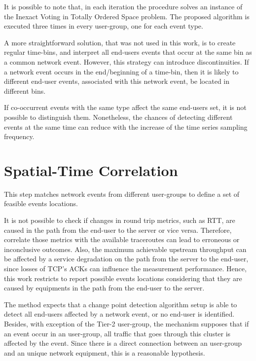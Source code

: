 It is possible to note that, in each iteration the procedure solves an instance
of the Inexact Voting in Totally Ordered Space problem.
The proposed algorithm is executed three times in every user-group,
one for each event type.

A more straightforward solution, that was not used in this work, is to create
regular time-bins, and interpret all end-users events that occur at the same
bin as a common network event.
However, this strategy can introduce
discontinuities. If a network event occurs in the end/beginning of a time-bin,
then it is likely to different end-user events, associated with this
network event, be located in different bins.

If co-occurrent events with the same type affect the same end-users set,
it is not possible to distinguish them. Nonetheless, the chances of
detecting different events at the same time can reduce with the increase
of the time series sampling frequency.

\section{Spatial-Time Correlation}
\label{sec:spatial_time_correlation}

This step matches network events from different user-groups to define
a set of feasible events locations.

It is not possible to check if changes in round trip metrics, such as RTT,
are caused in the path from the end-user to the server or vice versa.
Therefore, correlate those metrics with the available traceroutes can lead to
erroneous or inconclusive outcomes. Also, the maximum achievable upstream
throughput can be affected by a service degradation on the path from the server
to the end-user, since losses of TCP's ACKs can influence the measurement
performance.
Hence, this work restricts to report possible events locations considering that
they are caused by equipments in the path from the end-user to the server.

The method expects that
a change point detection algorithm setup is able to detect all end-users
affected by a network event, or no end-user is identified.
Besides, with exception of the Tier-2 user-group, the mechanism supposes that
if an event occur in an user-group,
all traffic that goes through this cluster is affected by the event. Since
there is a direct connection between an user-group and an unique network
equipment, this is a reasonable hypothesis.

